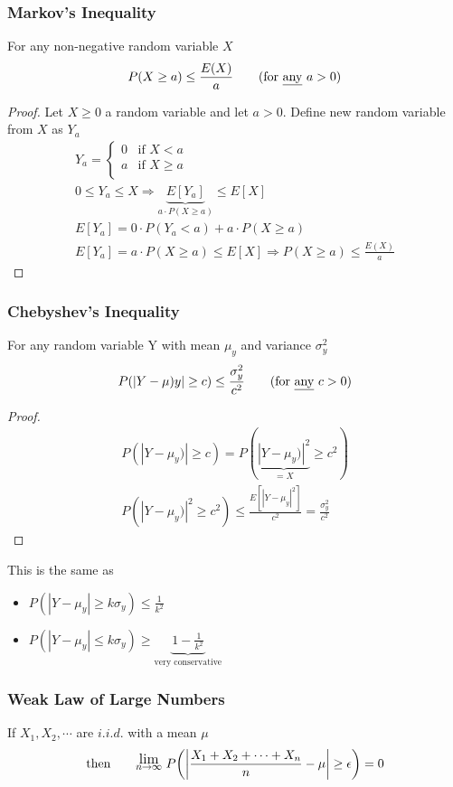 \subsubsection*{Markov's Inequality}
For any non-negative random variable $X$
\begin{equation*}
	P(X \geq a) \leq \frac{E(X)}{a} \tag{for \underline{any} $a > 0$}
\end{equation*}
\begin{proof}
	Let $X \geq 0$ a random variable and let $a > 0$.
	Define new random variable from $X$ as $Y_a$
	\begin{gather*}
		Y_a =
		\begin{cases}
 		0 & \text{if }	X < a\\
 		a & \text{if }	X \geq a\\
		 \end{cases}\\
		0 \leq Y_a \leq X \Longrightarrow \underbrace{E[Y_a]}_{a\cdot P(X \geq a)} \leq E[X]\\
		E[Y_a] = 0 \cdot P(Y_a < a) + a\cdot P(X \geq a)\\
		 E[Y_a] = a\cdot P(X \geq a) \leq E[X] \Longrightarrow \boxed{P(X \geq a) \leq \frac{E(X)}{a}}
	\end{gather*}
\end{proof}
\subsubsection*{Chebyshev's Inequality}
For any random variable Y with mean $\mu_y$ and variance $\sigma_y^2$
\begin{equation*}
	P(|Y - \mu)y| \geq c) \leq \frac{\sigma_y^2}{c^2} \tag{for \underline{any} $c > 0$}
\end{equation*}
\begin{proof}
	\begin{gather*}
		P(|Y - \mu_y)| \geq c) = P(\underbrace{|Y - \mu_y)|^2}_{=X} \geq c^2)\\
		P(|Y - \mu_y)|^2 \geq c^2) \leq \frac{E[|Y - \mu_y|^2]}{c^2} = \frac{\sigma_y^2}{c^2}
	\end{gather*}
\end{proof}
This is the same as
\begin{itemize}[label={--}]
	\item $P(|Y - \mu_y| \geq k \sigma_y) \leq \frac{1}{k^2}$
	\item $P(|Y - \mu_y| \leq k \sigma_y) \geq \underbrace{1- \frac{1}{k^2}}_{\text{very conservative}}$
\end{itemize}
\subsubsection*{Weak Law of Large Numbers}
If $X_1, X_2, \cdots$ are $i.i.d.$ with a mean $\mu$
\begin{equation*}
	\text{then} \qquad \mathlarger{\mathlarger{\Lim{n \rightarrow \infty}}} {\large P}\bigg( \bigg| \frac{X_1 + X_2 + \cdots + X_n}{n} - \mu \bigg| \geq \epsilon \bigg) = 0
\end{equation*}